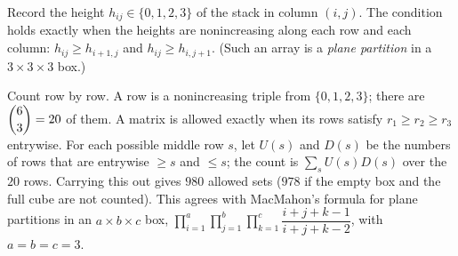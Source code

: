 Record the height $h_{ij}\in\{0,1,2,3\}$ of the stack in column $(i,j)$. The condition holds exactly when the heights are nonincreasing along each row and each column: $h_{ij}\ge h_{i+1,j}$ and $h_{ij}\ge h_{i,j+1}$. (Such an array is a \emph{plane partition} in a $3\times3\times3$ box.)

Count row by row. A row is a nonincreasing triple from $\{0,1,2,3\}$; there are $\dbinom{6}{3}=20$ of them. A matrix is allowed exactly when its rows satisfy $r_1\ge r_2\ge r_3$ entrywise. For each possible middle row $s$, let $U(s)$ and $D(s)$ be the numbers of rows that are entrywise $\ge s$ and $\le s$; the count is $\displaystyle\sum_s U(s)D(s)$ over the $20$ rows. Carrying this out gives $\boxed{980}$ allowed sets ($978$ if the empty box and the full cube are not counted). This agrees with MacMahon's formula for plane partitions in an $a\times b\times c$ box, $\prod_{i=1}^{a}\prod_{j=1}^{b}\prod_{k=1}^{c}\dfrac{i+j+k-1}{i+j+k-2}$, with $a=b=c=3$.
